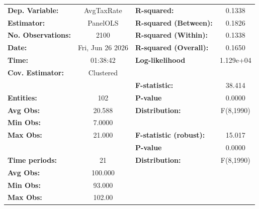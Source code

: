 \begin{center}
\begin{tabular}{lclc}
\toprule
\textbf{Dep. Variable:}                       &     AvgTaxRate     & \textbf{  R-squared:         }   &      0.1338      \\
\textbf{Estimator:}                           &      PanelOLS      & \textbf{  R-squared (Between):}  &      0.1826      \\
\textbf{No. Observations:}                    &        2100        & \textbf{  R-squared (Within):}   &      0.1338      \\
\textbf{Date:}                                &  Fri, Jun 26 2026  & \textbf{  R-squared (Overall):}  &      0.1650      \\
\textbf{Time:}                                &      01:38:42      & \textbf{  Log-likelihood     }   &    1.129e+04     \\
\textbf{Cov. Estimator:}                      &     Clustered      & \textbf{                     }   &                  \\
\textbf{}                                     &                    & \textbf{  F-statistic:       }   &      38.414      \\
\textbf{Entities:}                            &        102         & \textbf{  P-value            }   &      0.0000      \\
\textbf{Avg Obs:}                             &       20.588       & \textbf{  Distribution:      }   &    F(8,1990)     \\
\textbf{Min Obs:}                             &       7.0000       & \textbf{                     }   &                  \\
\textbf{Max Obs:}                             &       21.000       & \textbf{  F-statistic (robust):} &      15.017      \\
\textbf{}                                     &                    & \textbf{  P-value            }   &      0.0000      \\
\textbf{Time periods:}                        &         21         & \textbf{  Distribution:      }   &    F(8,1990)     \\
\textbf{Avg Obs:}                             &      100.000       & \textbf{                     }   &                  \\
\textbf{Min Obs:}                             &       93.000       & \textbf{                     }   &                  \\
\textbf{Max Obs:}                             &       102.00       & \textbf{                     }   &                  \\

\end{tabular}
\end{center}
